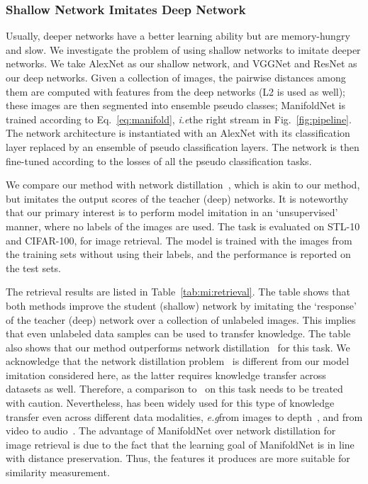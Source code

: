 \documentclass{bmvc2k}
\def\ie{\emph{i.e}\bmvaOneDot}
\def\eg{\emph{e.g}\bmvaOneDot}
\begin{document}
  
\subsubsection{Shallow Network Imitates Deep Network} 
Usually, deeper networks have a better
learning ability but are memory-hungry and slow. We investigate
the problem of using shallow networks to imitate
deeper networks. We take AlexNet as our shallow network, and VGGNet
and ResNet as our deep networks. Given a collection of images,
the pairwise distances among them are computed with features from the deep
networks (L2 is used as well); these images are then segmented into
ensemble pseudo classes; ManifoldNet is trained according to
Eq.~\ref{eq:manifold}, \ie the right stream in
Fig.~\ref{fig:pipeline}. The network architecture is instantiated
with an AlexNet with its classification layer replaced by an ensemble
of pseudo classification layers. The network is then fine-tuned
according to the losses of all the pseudo classification tasks.

We compare our method with network
distillation~\cite{hinton2015distilling}, which is akin to
our method, but imitates the output scores of the teacher (deep)
networks. It is noteworthy that our primary interest is to perform
model imitation in an `unsupervised' manner, where no labels of the
images are used.
The task is evaluated on STL-10 and CIFAR-100, for image
retrieval. The model is trained with the images from the training sets
without using their labels, and the performance is reported on the test sets. 


The retrieval results are listed in Table~\ref{tab:mi:retrieval}.
The table shows that both methods improve the student (shallow)
network by imitating the `response' of the teacher (deep) network over
a collection of unlabeled images. This implies that even
unlabeled data samples can be used to transfer knowledge. 
The table also shows that
our method outperforms network
distillation~\cite{hinton2015distilling} for this task. 
We acknowledge that the network distillation problem~\cite{hinton2015distilling} is different from our model imitation considered here, as the latter requires knowledge transfer across datasets as well. Therefore, a comparison to~\cite{hinton2015distilling} on this task needs to be treated with caution. Nevertheless, \cite{hinton2015distilling} has been widely used for this type of knowledge transfer  even across different data modalities, \eg from images to depth~\cite{supervision:transfer}, and from video
to audio~\cite{video2sound}.  
The advantage of ManifoldNet over network distillation for image retrieval is due to the fact that the learning goal of ManifoldNet is in line with distance preservation. Thus, the features it produces are more suitable for similarity measurement. 
\end{document}

